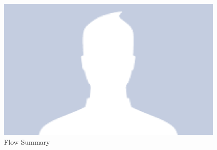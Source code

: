 \begin{figure}
    \includegraphics[width=\textwidth]{images/flow_summary.png}
    \caption{Flow Summary\label{fig:flow_summary}}
\end{figure}



